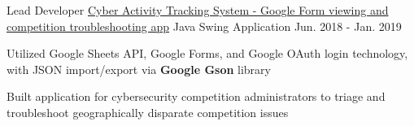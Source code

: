 \begin{cventries}
  \cventry
    {Lead Developer} %
    {\href{https://github.com/hexalellogram/FlyerScanner}{Cyber Activity Tracking System - Google Form viewing and competition troubleshooting app}} %
    {Java Swing Application} %
    {Jun. 2018 - Jan. 2019} %
    {
      \begin{cvitems} %
        \item {Utilized Google Sheets API, Google Forms, and Google OAuth login technology, with JSON import/export via \textbf{Google Gson} library}
        \item {Built application for cybersecurity competition administrators to triage and troubleshoot geographically disparate competition issues}
      \end{cvitems}
    }
    
\end{cventries}